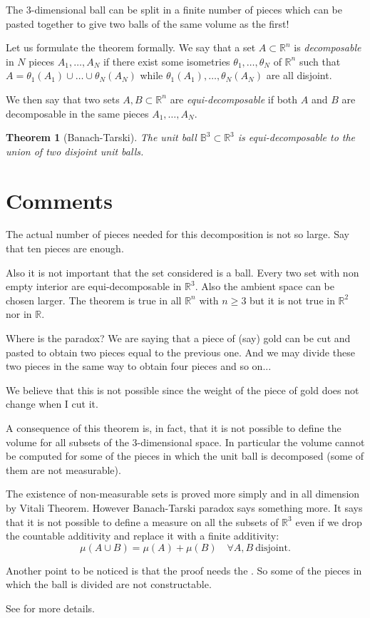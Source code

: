 \documentclass[12pt]{article}
\newtheorem{theorem}{Theorem}
\theoremstyle{remark}
\begin{document}
The $3$-dimensional ball can be split in a finite number of pieces which can be pasted together to give two balls of the same volume as the first!

Let us formulate the theorem formally. 
We say that a set $A\subset \mathbb R^n$ is \emph{decomposable} in $N$ pieces $A_1,\ldots, A_N$ if there exist some isometries $\theta_1,\ldots,\theta_N$ of $\mathbb R^n$ such that $A=\theta_1(A_1)\cup\ldots\cup \theta_N(A_N)$ while $\theta_1(A_1),\ldots,\theta_N(A_N)$ are all disjoint.

We then say that two sets $A,B\subset \mathbb R^n$ are \emph{equi-decomposable} if both $A$ and $B$ are decomposable in the same pieces $A_1,\ldots,A_N$.

\begin{theorem}[Banach-Tarski]
The unit ball $\mathbb B^3\subset \mathbb R^3$ is equi-decomposable to the union of two disjoint unit balls.
\end{theorem}

\section{Comments}

The actual number of pieces needed for this decomposition is not so large. Say that ten pieces are enough.

Also it is not important that the set considered is a ball. Every two set with non empty interior are equi-decomposable in $\mathbb R^3$. Also the ambient space can be chosen larger. The theorem is true in all $\mathbb R^n$ with $n\ge 3$ but it is not true in $\mathbb R^2$ nor in $\mathbb R$.

Where is the paradox? We are saying that a piece of (say) gold can be cut and pasted to obtain two pieces equal to the previous one. And we may divide these two pieces in the same way to obtain four pieces and so on...

We believe that this is not possible since the weight of the piece of gold does not change when I cut it.

A consequence of this theorem is, in fact, that it is not possible to define the volume for all subsets of the $3$-dimensional space. In particular the volume cannot be computed for some of the pieces in which the unit ball is decomposed (some of them are not measurable).

The existence of non-measurable sets is proved more simply and in all dimension by Vitali Theorem. However Banach-Tarski paradox says something more. It says that it is not possible to define a measure on all the subsets of $\mathbb R^3$ even if we drop the countable additivity and replace it with a finite additivity:
\[
  \mu(A\cup B) = \mu(A) + \mu (B)\quad \forall A,B\ \mathrm{disjoint}.
\]

Another point to be noticed is that the proof needs the . So some of the pieces in which the ball is divided are not constructable.

See 
for more details.
\end{document}

